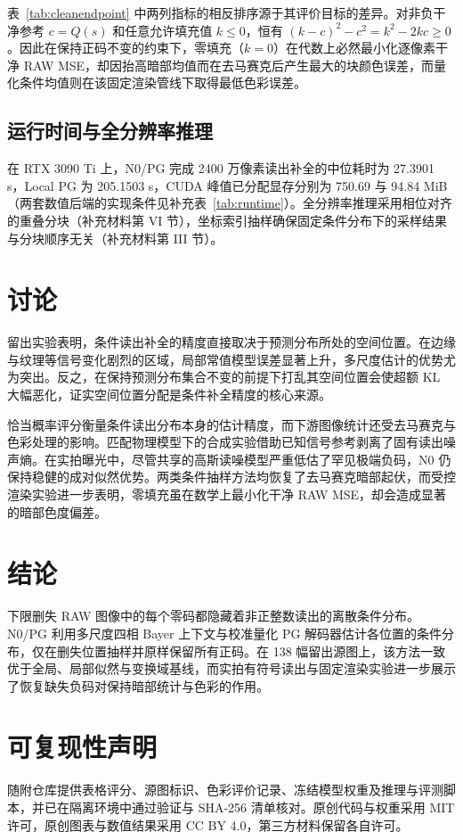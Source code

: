\documentclass[10pt,twocolumn,journal]{IEEEtran}
\begin{document}
表~\ref{tab:cleanendpoint} 中两列指标的相反排序源于其评价目标的差异。对非负干净参考 $c=Q(s)$ 和任意允许填充值 $k\leq0$，恒有 $(k-c)^2-c^2=k^2-2kc\geq0$。因此在保持正码不变的约束下，零填充（$k=0$）在代数上必然最小化逐像素干净 RAW MSE，却因抬高暗部均值而在去马赛克后产生最大的块颜色误差，而量化条件均值则在该固定渲染管线下取得最低色彩误差。

\subsection{运行时间与全分辨率推理}\label{sec:runtime}
在 RTX 3090 Ti 上，N0/PG 完成 2400 万像素读出补全的中位耗时为 27.3901 s，Local PG 为 205.1503 s，CUDA 峰值已分配显存分别为 750.69 与 94.84 MiB（两套数值后端的实现条件见补充表~\ref{tab:runtime}）。全分辨率推理采用相位对齐的重叠分块（补充材料第 VI 节），坐标索引抽样确保固定条件分布下的采样结果与分块顺序无关（补充材料第 III 节）。

\section{讨论}
留出实验表明，条件读出补全的精度直接取决于预测分布所处的空间位置。在边缘与纹理等信号变化剧烈的区域，局部常值模型误差显著上升，多尺度估计的优势尤为突出。反之，在保持预测分布集合不变的前提下打乱其空间位置会使超额 KL 大幅恶化，证实空间位置分配是条件补全精度的核心来源。

恰当概率评分衡量条件读出分布本身的估计精度，而下游图像统计还受去马赛克与色彩处理的影响。匹配物理模型下的合成实验借助已知信号参考剥离了固有读出噪声熵。在实拍曝光中，尽管共享的高斯读噪模型严重低估了罕见极端负码，N0 仍保持稳健的成对似然优势。两类条件抽样方法均恢复了去马赛克暗部起伏，而受控渲染实验进一步表明，零填充虽在数学上最小化干净 RAW MSE，却会造成显著的暗部色度偏差。

\section{结论}
下限删失 RAW 图像中的每个零码都隐藏着非正整数读出的离散条件分布。N0/PG 利用多尺度四相 Bayer 上下文与校准量化 PG 解码器估计各位置的条件分布，仅在删失位置抽样并原样保留所有正码。在 138 幅留出源图上，该方法一致优于全局、局部似然与变换域基线，而实拍有符号读出与固定渲染实验进一步展示了恢复缺失负码对保持暗部统计与色彩的作用。

\section*{可复现性声明}
随附仓库提供表格评分、源图标识、色彩评价记录、冻结模型权重及推理与评测脚本，并已在隔离环境中通过验证与 SHA-256 清单核对。原创代码与权重采用 MIT 许可，原创图表与数值结果采用 CC BY 4.0，第三方材料保留各自许可。
\end{document}
